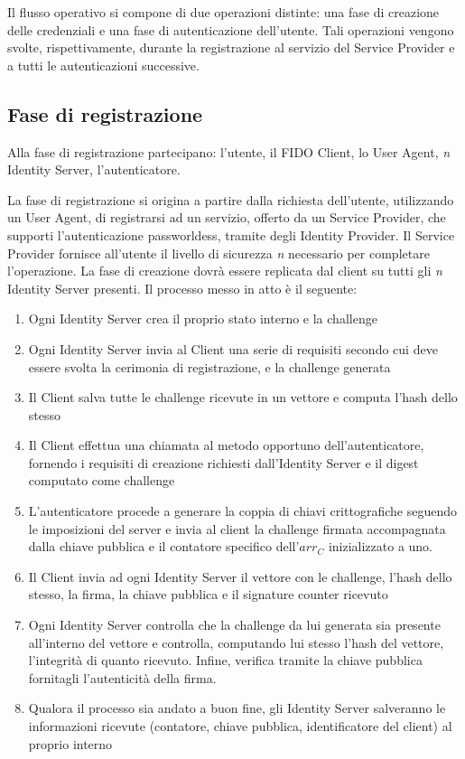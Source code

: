 Il flusso operativo si compone di due operazioni distinte: una fase di creazione delle credenziali e una fase di autenticazione dell'utente. Tali operazioni vengono svolte, rispettivamente, durante la registrazione al servizio del Service Provider e a tutti le autenticazioni successive.

\subsection{Fase di registrazione}
\label{registrazione}

Alla fase di registrazione partecipano: l'utente, il FIDO Client, lo User Agent, \emph{n} Identity Server, l'autenticatore.

La fase di registrazione si origina a partire dalla richiesta dell'utente, utilizzando un User Agent, di registrarsi ad un servizio, offerto da un Service Provider, che supporti l'autenticazione passworldess, tramite degli Identity Provider. Il Service Provider fornisce all'utente il livello di sicurezza \emph{n} necessario per completare l'operazione. La fase di creazione dovrà essere replicata dal client su tutti gli \emph{n} Identity Server presenti.  Il processo messo in atto è il seguente:

\begin{enumerate}
	\item Ogni Identity Server crea il proprio stato interno e la challenge
	\item Ogni Identity Server invia al Client una serie di requisiti secondo cui deve essere svolta la cerimonia di registrazione, e la challenge generata
	\item Il Client salva tutte le challenge ricevute in un vettore e computa l'hash dello stesso
	\item Il Client effettua una chiamata al metodo opportuno dell'autenticatore, fornendo i requisiti di creazione richiesti dall'Identity Server e il digest computato come challenge
	\item L'autenticatore procede a generare la coppia di chiavi crittografiche seguendo le imposizioni del server e invia al client la challenge firmata accompagnata dalla chiave pubblica e il contatore specifico dell'${arr_C}$ inizializzato a uno.
	\item Il Client invia ad ogni Identity Server il vettore con le challenge, l'hash dello stesso, la firma, la chiave pubblica e il signature counter ricevuto
	\item Ogni Identity Server controlla che la challenge da lui generata sia presente all'interno del vettore e controlla, computando lui stesso l'hash del vettore, l'integrità di quanto ricevuto. Infine, verifica tramite la chiave pubblica fornitagli l'autenticità della firma.
	\item Qualora il processo sia andato a buon fine, gli Identity Server salveranno le informazioni ricevute (contatore, chiave pubblica, identificatore del client) al proprio interno
\end{enumerate} 

